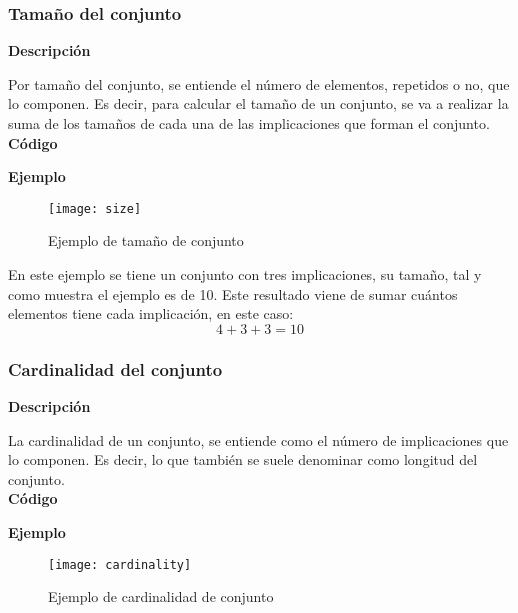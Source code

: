 \subsubsection{Tama\~no del conjunto}

    \textbf{Descripci\'on}

    Por tama\~no del conjunto, se entiende el n\'umero de elementos, repetidos o no, que lo componen. 
    Es decir, para calcular el tama\~no de un conjunto, se va a realizar la suma de los tama\~nos de cada una de 
    las implicaciones que forman el conjunto.
    \\


    \textbf{C\'odigo}

    
    \bigskip

    \textbf{Ejemplo}

    \begin{figure}[H]
        \centering
        \texttt{[image: size]}
        \caption{Ejemplo de tama\~no de conjunto}
        \label{fig:size}
    \end{figure}

    En este ejemplo se tiene un conjunto con tres implicaciones, su tama\~no, tal y como muestra el ejemplo es de 10. 
    Este resultado viene de sumar cu\'antos elementos tiene cada implicaci\'on, en este caso:
    \[
        4 + 3 + 3 = 10    
    \]



\subsubsection{Cardinalidad del conjunto}

    \textbf{Descripci\'on}

    La cardinalidad de un conjunto, se entiende como el n\'umero de implicaciones que lo componen. Es decir, lo que 
    tambi\'en se suele denominar como longitud del conjunto.
    \\


    \textbf{C\'odigo}

    
    \bigskip

    \textbf{Ejemplo}


    \begin{figure}[H]
        \centering
        \texttt{[image: cardinality]}
        \caption{Ejemplo de cardinalidad de conjunto}
        \label{fig:cardinality}
    \end{figure}

